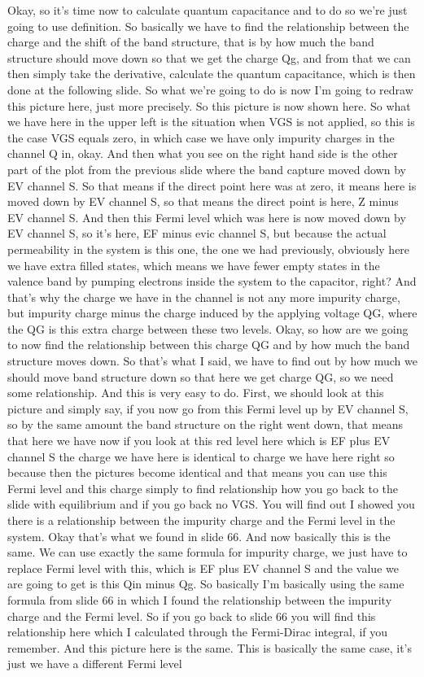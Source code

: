 Okay, so it's time now to calculate quantum capacitance and to do so we're just going to use definition. So basically we have to find the relationship between the charge and the shift of the band structure, that is by how much the band structure should move down so that we get the charge Qg, and from that we can then simply take the derivative, calculate the quantum capacitance, which is then done at the following slide. So what we're going to do is now I'm going to redraw this picture here, just more precisely. So this picture is now shown here. So what we have here in the upper left is the situation when VGS is not applied, so this is the case VGS equals zero, in which case we have only impurity charges in the channel Q in, okay. And then what you see on the right hand side is the other part of the plot from the previous slide where the band capture moved down by EV channel S. So that means if the direct point here was at zero, it means here is moved down by EV channel S, so that means the direct point is here, Z minus EV channel S. And then this Fermi level which was here is now moved down by EV channel S, so it's here, EF minus evic channel S, but because the actual permeability in the system is this one, the one we had previously, obviously here we have extra filled states, which means we have fewer empty states in the valence band by pumping electrons inside the system to the capacitor, right? And that's why the charge we have in the channel is not any more impurity charge, but impurity charge minus the charge induced by the applying voltage QG, where the QG is this extra charge between these two levels. Okay, so how are we going to now find the relationship between this charge QG and by how much the band structure moves down. So that's what I said, we have to find out by how much we should move band structure down so that here we get charge QG, so we need some relationship. And this is very easy to do. First, we should look at this picture and simply say, if you now go from this Fermi level up by EV channel S, so by the same amount the band structure on the right went down, that means that here we have now if you look at this red level here which is EF plus EV channel S the charge we have here is identical to charge we have here right so because then the pictures become identical and that means you can use this Fermi level and this charge simply to find relationship how you go back to the slide with equilibrium and if you go back no VGS. You will find out I showed you there is a relationship between the impurity charge and the Fermi level in the system. Okay that's what we found in slide 66. And now basically this is the same. We can use exactly the same formula for impurity charge, we just have to replace Fermi level with this, which is EF plus EV channel S and the value we are going to get is this Qin minus Qg. So basically I'm basically using the same formula from slide 66 in which I found the relationship between the impurity charge and the Fermi level. So if you go back to slide 66 you will find this relationship here which I calculated through the Fermi-Dirac integral, if you remember. And this picture here is the same. This is basically the same case, it's just we have a different Fermi level 